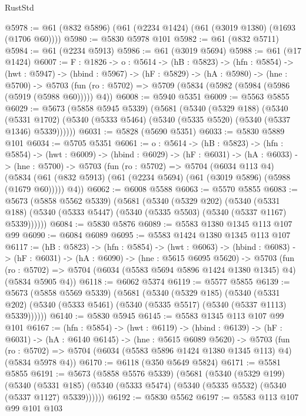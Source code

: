 \begin{lexlean}{RustStd}
\begin{coremodule}
@5978 := @61 (@832 @5896) (@61 (@2234 @1424) (@61 (@3019 @1380) (@1693 (@1706 @60))))
@5980 := @5830 @5978 @101
@5982 := @61 (@832 @5711)
@5984 := @61 (@2234 @5913)
@5986 := @61 (@3019 @5694)
@5988 := @61 (@17 @1424)
@6007 := {F : @1826} ->
  {o : @5614} ->
  (hB : @5823) ->
  (hfn : @5854) ->
  (hwt : @5947) ->
  (hbind : @5967) ->
  (hF : @5829) ->
  (hA : @5980) ->
  (hne : @5700) ->
  @5703 (fun (ro : @5702) => @5709 (@5834 (@5982 (@5984 (@5986 (@5919 (@5988 @60))))) @4))
@6008 := @5940 @5351
@6009 := @5563 @5855
@6029 := @5673
    (@5858 @5945 @5339)
    (@5681
      (@5340
        (@5329 @188)
        (@5340
          (@5331 @1702)
          (@5340 (@5333 @5464) (@5340 (@5335 @5520) (@5340 (@5337 @1346) @5339))))))
@6031 := @5828 (@5690 @5351)
@6033 := @5830 @5889 @101
@6034 := @5705 @5351
@6061 := {o : @5614} ->
  (hB : @5823) ->
  (hfn : @5854) ->
  (hwt : @6009) ->
  (hbind : @6029) ->
  (hF : @6031) ->
  (hA : @6033) ->
  (hne : @5700) ->
  @5703
    (fun (ro : @5702) =>
    @5704
      (@6034 @113 @4)
      (@5834 (@61 (@832 @5913) (@61 (@2234 @5694) (@61 (@3019 @5896) (@5988 (@1679 @60))))) @4))
@6062 := @6008 @5588
@6063 := @5570 @5855
@6083 := @5673
    (@5858 @5562 @5339)
    (@5681
      (@5340
        (@5329 @202)
        (@5340
          (@5331 @188)
          (@5340 (@5333 @5447) (@5340 (@5335 @5503) (@5340 (@5337 @1167) @5339))))))
@6084 := @5830 @5876
@6089 := @5583 @1380 @1345 @113 @107 @99
@6090 := @6084 @6089
@6095 := @5583 @1424 @1380 @1345 @113 @107
@6117 := (hB : @5823) ->
  (hfn : @5854) ->
  (hwt : @6063) ->
  (hbind : @6083) ->
  (hF : @6031) ->
  (hA : @6090) ->
  (hne : @5615 @6095 @5620) ->
  @5703
    (fun (ro : @5702) => @5704 (@6034 (@5583 @5694 @5896 @1424 @1380 @1345) @4) (@5834 @5905 @4))
@6118 := @6062 @5374
@6119 := @5577 @5855
@6139 := @5673
    (@5858 @5569 @5339)
    (@5681
      (@5340
        (@5329 @185)
        (@5340
          (@5331 @202)
          (@5340 (@5333 @5461) (@5340 (@5335 @5517) (@5340 (@5337 @1113) @5339))))))
@6140 := @5830 @5945
@6145 := @5583 @1345 @113 @107 @99 @101
@6167 := (hfn : @5854) ->
  (hwt : @6119) ->
  (hbind : @6139) ->
  (hF : @6031) ->
  (hA : @6140 @6145) ->
  (hne : @5615 @6089 @5620) ->
  @5703 (fun (ro : @5702) => @5704 (@6034 (@5583 @5896 @1424 @1380 @1345 @113) @4) (@5834 @5978 @4))
@6170 := @6118 (@350 @5649 @5824)
@6171 := @5581 @5855
@6191 := @5673
    (@5858 @5576 @5339)
    (@5681
      (@5340
        (@5329 @199)
        (@5340
          (@5331 @185)
          (@5340 (@5333 @5474) (@5340 (@5335 @5532) (@5340 (@5337 @1127) @5339))))))
@6192 := @5830 @5562
@6197 := @5583 @113 @107 @99 @101 @103

\end{coremodule}
\end{lexlean}
